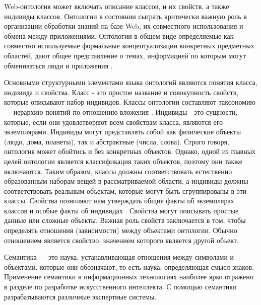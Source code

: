Web-онтология может включать описание классов, и их свойств, а также индивиды классов. Онтологии в состоянии сыграть критически важную роль в организации обработки знаний на базе Web, их совместного использования и обмена между приложениями. Онтологии в общем виде определяемые как совместно используемые формальные концептуализации конкретных предметных областей, дают общее представление о темах, информацией по которым могут обмениваться люди и приложения \cite{suarez2012ontology}. 

Основными структурными элементами языка онтологий являются понятия класса, индивида и свойства. Класс - это простое название и совокупность свойств, которые описывают набор индивидов. Классы онтологии составляют таксономию — иерархию понятий по отношению вложения \cite{lapshin2010ontology}. Индивиды - это сущности, которые, если они удовлетворяют всем свойствам класса, являются его экземплярами. Индивиды могут представлять собой как физические объекты (люди, дома, планеты), так и абстрактные (числа, слова). Строго говоря, онтология может обойтись и без конкретных объектов. Однако, одной из главных целей онтологии является классификация таких объектов, поэтому они также включаются. Таким образом, классы должны соответствовать естественно образованным наборам вещей в рассматриваемой области, а индивиды должны соответствовать реальным объектам, которые могут быть сгруппированы в эти классы. Свойства позволяют нам утверждать общие факты об экземплярах классов и особые факты об индивидах \cite{shumski2010preobraz}. Свойства могут описывать простые данные или сложные объекты. Важная роль свойств заключается в том, чтобы определять отношения (зависимости) между объектами онтологии. Обычно отношением является свойство, значением которого является другой объект.

Семантика — это наука, устанавливающая отношения между символами и объектами, которые они обозначают, то есть наука, определяющая смысл знаков. Применение семантики в информационных технологиях наиболее ярко отражено в разделе по разработке искусственного интеллекта. С помощью семантики разрабатываются различные экспертные системы.

